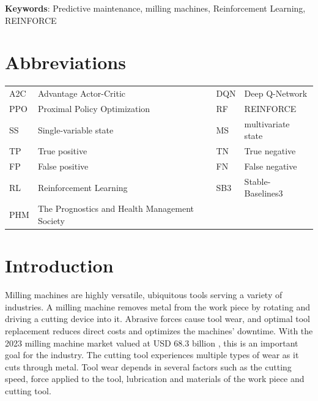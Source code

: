 \documentclass[a4paper, 12pt]{article}
\newcommand{\rowspace}[1]{\renewcommand{\arraystretch}{#1}}
\begin{document}
\noindent \textbf{Keywords}: Predictive maintenance, milling machines, Reinforcement Learning, REINFORCE

\section*{Abbreviations}

\begin{table}[!htbp]\centering
	\sffamily
	\rowspace{1.3}
	\begin{tabular}{L{1cm} L{4.5cm} L{1cm} L{4.5cm}}
		\toprule	
		
		A2C & Advantage Actor-Critic & DQN & Deep Q-Network\\
		PPO & Proximal Policy Optimization & RF & REINFORCE\\
		SS & Single-variable state & MS & multivariate state\\
		TP &True positive &TN &True negative\\
		FP &False positive &FN &False negative\\
		RL & Reinforcement Learning & SB3 & Stable-Baselines3\\
		PHM & The Prognostics and Health Management Society & & \\

		\bottomrule
	\end{tabular}
	\label{tbl:abbrev}
\end{table}

\newpage
\thispagestyle{empty}

\section{Introduction}


Milling machines are highly versatile, ubiquitous tools serving a variety of industries. A milling machine removes metal from the work piece by rotating and driving a cutting device into it. Abrasive forces cause tool wear, and optimal tool replacement reduces direct costs and optimizes the machines' downtime. With the 2023 milling machine market valued at USD 68.3 billion \citep{milling-market}, this is an important goal for the industry. The cutting tool experiences multiple types of wear as it cuts through metal. Tool wear depends in several factors such as the cutting speed, force applied to the tool, lubrication and materials of the work piece and cutting tool. 
\end{document}
